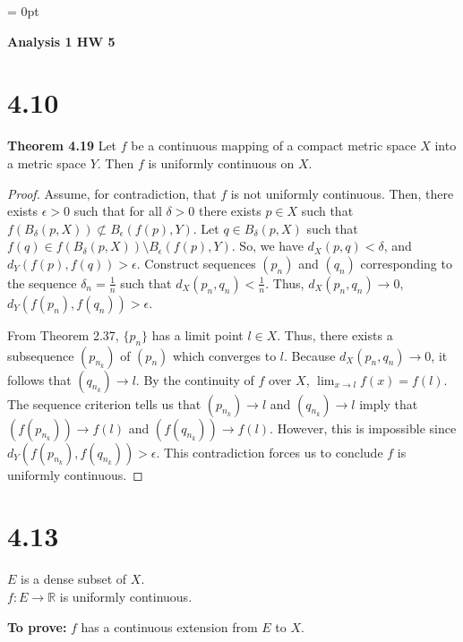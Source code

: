 \documentclass[12pt]{article}
\begin{document}


\setcounter{section}{0}
\renewcommand{\thesection}{}


\parindent = 0pt


      {\bf Analysis 1 HW 5} 

\section{4.10}
{\bf Theorem 4.19} Let $f$ be a continuous mapping of a compact metric space $X$ into a metric space $Y$. Then $f$ is uniformly continuous on $X$. 

\begin{proof}
      Assume, for contradiction, that $f$ is not uniformly continuous. Then,
      there exists $\epsilon>0$ such 
      that for all $\delta>0$ there exists $p\in X$ such that 
      $f(B_{\delta}(p, X))\not\subset B_{\epsilon}(f(p), Y)$. 
      Let $q\in B_{\delta}(p, X)$ such that 
      $f(q)\in f(B_{\delta}(p, X))\setminus B_{\epsilon}(f(p), Y)$. So, we 
      have $d_{X}(p, q)<\delta$, and $d_{Y}(f(p), f(q))>\epsilon$. Construct 
      sequences $(p_{n})$ and $(q_{n})$ corresponding to the sequence
      $\delta_n =\frac{1}{n}$ such that $d_X(p_n, q_n)<\frac{1}{n}$.
      Thus, $d_{X}(p_{n}, q_{n})\to {0}$, $d_{Y}(f(p_n), f(q_n))>\epsilon$. 

      From Theorem 2.37, $\{ p_{n} \}$ has a limit point 
      $l\in X$. Thus, there exists a subsequence $(p_{n_{k}})$ of $(p_{n})$ 
      which converges to $l$. Because $d_{X}(p_{n}, q_{n})\to 0$, it follows 
      that $(q_{n_{k}})\to l$. By the continuity of $f$ over $X$, 
      $\lim_{ x \to l }f(x)=f(l)$. The sequence criterion tells us 
      that $(p_{n_{k}})\to l$ and $(q_{n_{k}})\to l$ imply that 
      $(f(p_{n_{k}}))\to f(l)$ and $(f(q_{n_{k}}))\to f(l)$. However, 
      this is impossible since 
      $d_{Y}(f(p_{n_{k}}), f(q_{n_{k}}))>\epsilon$. This contradiction 
      forces us to conclude $f$ is uniformly continuous. 
\end{proof}

\pagebreak

\section{4.13}
$E$ is a dense subset of $X$.\\
$f:E\to \mathbb{R}$ is uniformly continuous.

{\bf To prove:} $f$ has a continuous extension from $E$ to $X$.
\end{document}
